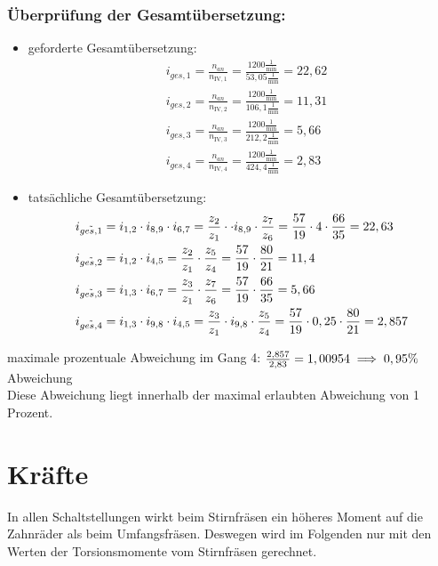 \subsubsection{Überprüfung der Gesamtübersetzung:}
\begin{itemize}
\item geforderte Gesamtübersetzung:
\begin{align*}
	&i_{ges,1} = \frac{n_{an}}{n_{\mathrm{IV},1}} = \frac{1200 \frac{1}{\text{min}}}{53,05 \frac{1}{\text{min}}} = 22,62 \\
	&i_{ges,2} = \frac{n_{an}}{n_{\mathrm{IV},2}} = \frac{1200 \frac{1}{\text{min}}}{106,1 \frac{1}{\text{min}}} = 11,31 \\
	&i_{ges,3} = \frac{n_{an}}{n_{\mathrm{IV},3}} = \frac{1200 \frac{1}{\text{min}}}{212,2 \frac{1}{\text{min}}} = 5,66 \\
	&i_{ges,4} = \frac{n_{an}}{n_{\mathrm{IV},4}} = \frac{1200 \frac{1}{\text{min}}}{424,4 \frac{1}{\text{min}}} = 2,83
\end{align*}

\item tatsächliche Gesamtübersetzung:
	\begin{align*}
	&i_{\tilde{ges,1}} = i_{1,2} \cdot i_{8,9} \cdot i_{6,7} = \frac{z_2}{z_1} \cdot \cdot i_{8,9} \cdot \frac{z_{7}}{z_{6}} = \frac{57}{19} \cdot 4 \cdot \frac{66}{35}= 22,63 \\
	&i_{\tilde{ges,2}} = i_{1,2} \cdot i_{4,5} = \frac{z_2}{z_1} \cdot \frac{z_{5}}{z_{4}} = \frac{57}{19} \cdot \frac{80}{21} = 11,4 \\
	&i_{\tilde{ges,3}} = i_{1,3} \cdot i_{6,7} = \frac{z_3}{z_1} \cdot \frac{z_{7}}{z_{6}} = \frac{57}{19} \cdot \frac{66}{35} = 5,66\\
	&i_{\tilde{ges,4}} = i_{1,3} \cdot i_{9,8} \cdot i_{4,5} = \frac{z_3}{z_1} \cdot i_{9,8} \cdot \frac{z_{5}}{z_{4}} = \frac{57}{19} \cdot  0,25 \cdot \frac{80}{21} = 2,857
	\end{align*}
\end{itemize}
maximale prozentuale Abweichung im Gang 4: $\frac{2,857}{2,83} = 1,00954\\
\implies 0,95 \% $ Abweichung \\
Diese Abweichung liegt innerhalb der maximal erlaubten Abweichung von 1 Prozent.
\newpage
\section{Kräfte}
In allen Schaltstellungen wirkt beim Stirnfräsen ein höheres Moment auf die Zahnräder als beim Umfangsfräsen. Deswegen wird im Folgenden nur mit den Werten der Torsionsmomente vom Stirnfräsen gerechnet. 
